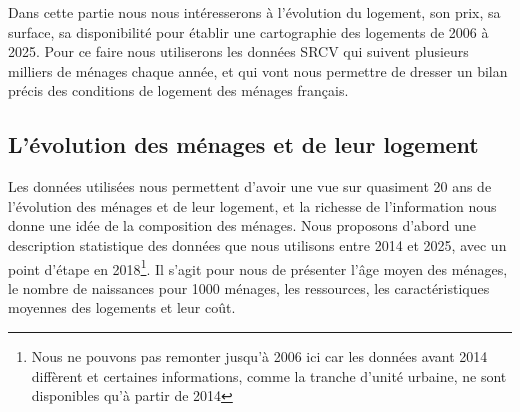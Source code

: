 \documentclass[12pt,a4paper]{article}
\begin{document}
\noindent Dans cette partie nous nous intéresserons à l’évolution du logement, son prix, sa surface, sa disponibilité pour établir une cartographie des logements de 2006 à 2025. Pour ce faire nous utiliserons les données SRCV qui suivent plusieurs milliers de ménages chaque année, et qui vont nous permettre de dresser un bilan précis des conditions de logement des ménages français. 

\subsection{L'évolution des ménages et de leur logement}

Les données utilisées nous permettent d'avoir une vue sur quasiment 20 ans de l'évolution des ménages et de leur logement, et la richesse de l'information nous donne une idée de la composition des ménages. Nous proposons d'abord une description statistique des données que nous utilisons entre 2014 et 2025, avec un point d'étape en 2018\footnote{Nous ne pouvons pas remonter jusqu'à 2006 ici car les données avant 2014 diffèrent et certaines informations, comme la tranche d'unité urbaine, ne sont disponibles qu'à partir de 2014}. Il s'agit pour nous de présenter l'âge moyen des ménages, le nombre de naissances pour 1000 ménages, les ressources, les caractéristiques moyennes des logements et leur coût.  
\end{document}
